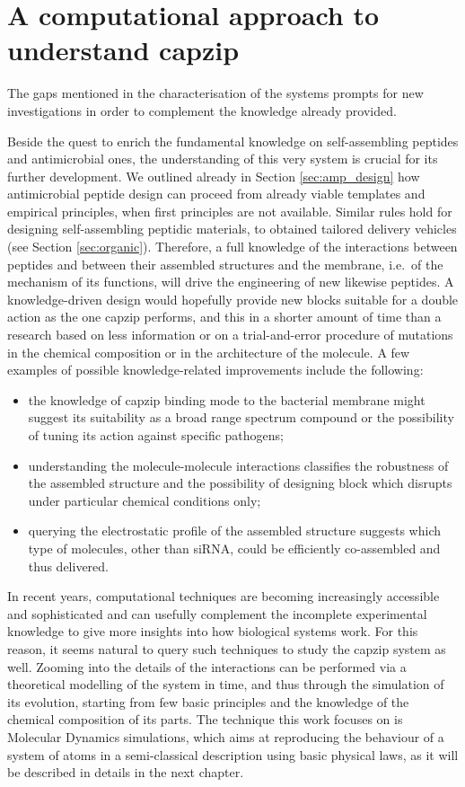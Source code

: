 \section{A computational approach to understand capzip}

The gaps mentioned in the characterisation of the systems prompts for new investigations in order to complement the knowledge already provided.

Beside the quest to enrich the fundamental knowledge on self-assembling peptides and antimicrobial ones, the understanding of this very system is crucial for its further development. We outlined already in Section \ref{sec:amp_design} how antimicrobial peptide design can proceed from already viable templates and empirical principles, when first principles are not available. Similar rules hold for designing self-assembling peptidic materials, to obtained tailored delivery vehicles (see Section \ref{sec:organic}).
%
Therefore, a full knowledge of the interactions between peptides and between their assembled structures and the membrane, i.e.\ of the mechanism of its functions, will drive the engineering of new likewise peptides. A knowledge-driven design would hopefully provide new blocks suitable for a double action as the one capzip performs, and this in a shorter amount of time than a research based on less information or on a trial-and-error procedure of mutations in the chemical composition or in the architecture of the molecule. A few examples of possible knowledge-related improvements include the following:
\begin{itemize}
\item the knowledge of capzip binding mode to the bacterial membrane might suggest its suitability as a broad range spectrum compound or the possibility of tuning its action against specific pathogens;
\item understanding the molecule-molecule interactions classifies the robustness of the assembled structure and the possibility of designing block which disrupts under particular chemical conditions only;
\item querying the electrostatic profile of the assembled structure suggests which type of molecules, other than siRNA, could be efficiently co-assembled and thus delivered.
\end{itemize}

In recent years, computational techniques are becoming increasingly accessible and sophisticated and can usefully complement the incomplete experimental knowledge to give more insights into how biological systems work. For this reason, it seems natural to query such techniques to study the capzip system as well. Zooming into the details of the interactions can be performed via a theoretical modelling of the system in time, and thus through the simulation of its evolution, starting from few basic principles and the knowledge of the chemical composition of its parts. The technique this work focuses on is Molecular Dynamics simulations, which aims at reproducing the behaviour of a system of atoms in a semi-classical description using basic physical laws, as it will be described in details in the next chapter.

